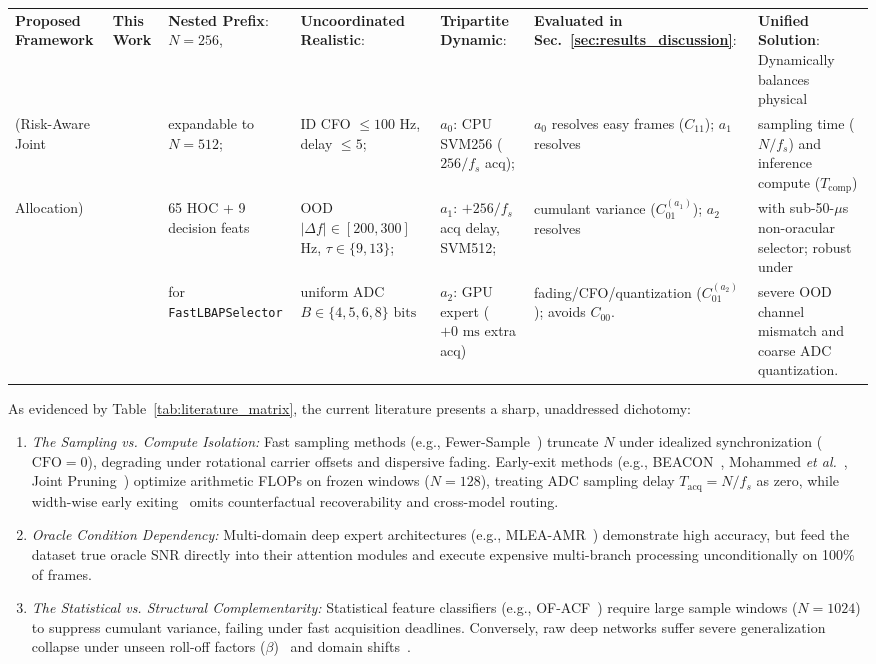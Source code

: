 \begin{table}[!t]
{\begin{tabular}{|l|l|l|l|l|l|l|}
\textbf{Proposed Framework} & 
\textbf{This Work} & 
\textbf{Nested Prefix}: $N=256$, & 
\textbf{Uncoordinated Realistic}: & 
\textbf{Tripartite Dynamic}: & 
\textbf{Evaluated in Sec.~\ref{sec:results_discussion}}: & 
\textbf{Unified Solution}: Dynamically balances physical \\
(Risk-Aware Joint & 
& 
expandable to $N=512$; & 
ID CFO $\le 100$ Hz, delay $\le 5$; & 
$a_0$: CPU SVM256 ($256/f_s$ acq); & 
$a_0$ resolves easy frames ($C_{11}$); $a_1$ resolves & 
sampling time ($N/f_s$) and inference compute ($T_{\text{comp}}$) \\
Allocation) & 
& 
65 HOC + 9 decision feats & 
OOD $|\Delta f| \in [200, 300]$ Hz, $\tau \in \{9,13\}$; & 
$a_1$: $+256/f_s$ acq delay, SVM512; & 
cumulant variance ($C_{01}^{(a_1)}$); $a_2$ resolves & 
with sub-50-$\mu$s non-oracular selector; robust under \\
& 
& 
for \texttt{FastLBAPSelector} & 
uniform ADC $B \in \{4, 5, 6, 8\}\text{ bits}$ & 
$a_2$: GPU expert ($+0\text{ ms}$ extra acq) & 
fading/CFO/quantization ($C_{01}^{(a_2)}$); avoids $C_{00}$. & 
severe OOD channel mismatch and coarse ADC quantization. \\ \hline
\end{tabular}%
}
\end{table}

As evidenced by Table~\ref{tab:literature_matrix}, the current literature presents a sharp, unaddressed dichotomy:
\begin{enumerate}
    \item \emph{The Sampling vs. Compute Isolation:} Fast sampling methods (e.g., Fewer-Sample~\cite{guo2025fewer}) truncate $N$ under idealized synchronization ($\text{CFO}=0$), degrading under rotational carrier offsets and dispersive fading. Early-exit methods (e.g., BEACON~\cite{liu2026beacon}, Mohammed \emph{et al.}~\cite{mohammed2023early}, Joint Pruning~\cite{liu2025joint}) optimize arithmetic FLOPs on frozen windows ($N=128$), treating ADC sampling delay $T_{\text{acq}} = N/f_s$ as zero, while width-wise early exiting~\cite{verbruggen2025width} omits counterfactual recoverability and cross-model routing.
    \item \emph{Oracle Condition Dependency:} Multi-domain deep expert architectures (e.g., MLEA-AMR~\cite{gao2026mlea}) demonstrate high accuracy, but feed the dataset true oracle SNR directly into their attention modules and execute expensive multi-branch processing unconditionally on 100\% of frames.
    \item \emph{The Statistical vs. Structural Complementarity:} Statistical feature classifiers (e.g., OF-ACF~\cite{xia2026optimal}) require large sample windows ($N=1024$) to suppress cumulant variance, failing under fast acquisition deadlines. Conversely, raw deep networks suffer severe generalization collapse under unseen roll-off factors ($\beta$)~\cite{quan2026fftformer} and domain shifts~\cite{li2026openset}.
\end{enumerate}

